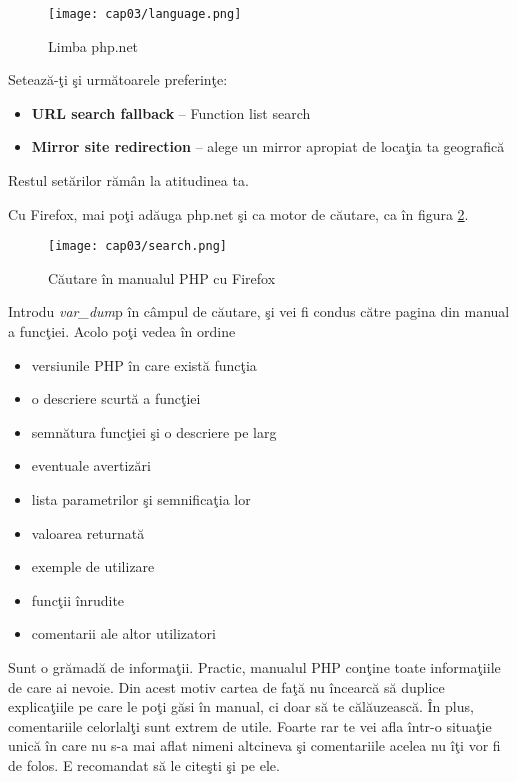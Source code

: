 \begin{figure}[ht!]
  \centering
    \texttt{[image: cap03/language.png]}
  \caption{Limba php.net}
  \label{fig:php.net lang}
\end{figure}
Setează-ţi şi următoarele preferinţe:
\begin{itemize}
\item \textbf{URL search fallback} -- Function list search
\item \textbf{Mirror site redirection} -- alege un mirror apropiat de locaţia ta geografică
\end{itemize}
Restul setărilor rămân la atitudinea ta.

Cu Firefox, mai poţi adăuga php.net şi ca motor de căutare, ca în
figura \ref{fig:php.net search}.

\begin{figure}[ht!]
  \centering
    \texttt{[image: cap03/search.png]}
  \caption{Căutare în manualul PHP cu Firefox}
  \label{fig:php.net search}
\end{figure}

Introdu \textit{var\_dum}p în câmpul de căutare, şi vei fi condus
către pagina din manual a funcţiei. Acolo poţi vedea
în ordine
\begin{itemize}
\item versiunile PHP în care există funcţia
\item o descriere scurtă a funcţiei
\item semnătura funcţiei şi o descriere pe larg
\item eventuale avertizări
\item lista parametrilor şi semnificaţia lor
\item valoarea returnată
\item exemple de utilizare
\item funcţii înrudite
\item comentarii ale altor utilizatori
\end{itemize}
Sunt o grămadă de informaţii. Practic, manualul
PHP conţine toate informaţiile de care ai nevoie.
Din acest motiv cartea de faţă nu încearcă să 
duplice explicaţiile pe care le poţi găsi în manual,
ci doar să te călăuzească. În plus, comentariile
celorlalţi sunt extrem de utile. Foarte rar te vei
afla într-o situaţie unică în care nu s-a mai aflat
nimeni altcineva şi comentariile acelea nu îţi vor fi de 
folos. E recomandat să le citeşti şi pe ele.


